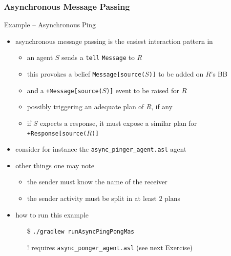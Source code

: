 \documentclass[presentation]{beamer}\mode<presentation>{\usetheme{AMSBolognaFC}}
\begin{document}
\subsubsection{Asynchronous Message Passing}

\begin{frame}[c, allowframebreaks]{Example \theJasonExample{} -- Asynchronous Ping}
\begin{itemize}
    \item asynchronous message passing is the easiest interaction pattern in \jason{}
    \begin{itemize}
        \item an agent $S$ sends a \alert{\texttt{tell}} \texttt{Message} to $R$
        \item this provokes a belief \texttt{Message[source($S$)]} to be added on $R$'s BB
        \item and a \texttt{+Message[source($S$)]} event to be raised for $R$
        \item possibly triggering an adequate plan of $R$, if any
        \item if $S$ expects a response, it must expose a similar plan for \texttt{+Response[source($R$)]}
    \end{itemize}
    
    \vspace{.3cm}
    
    \item consider for instance the \texttt{async\_pinger\_agent.asl} agent
    
    
    \vspace{.3cm}
    
    \item other things one may note
    \begin{itemize}
        \item the sender must know the name of the receiver
        \item the sender activity must be split in at least 2 plans
    \end{itemize}
    
    \vspace{.3cm}
    
    \item how to run this example
    \begin{itemize}
        \item[\$] \texttt{./gradlew run\alert{AsyncPingPong}Mas}
        \item[!] requires \texttt{async\_ponger\_agent.asl} (see next Exercise) 
    \end{itemize}
    
\end{itemize}
\end{frame}
\end{document}
